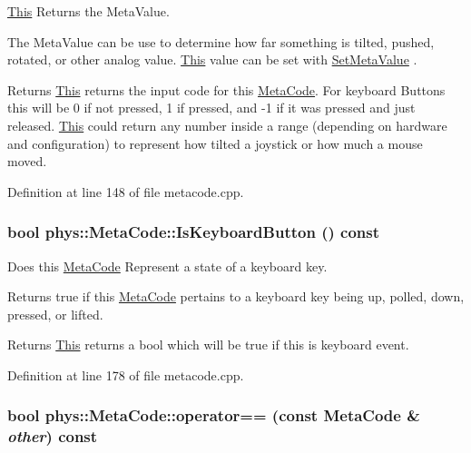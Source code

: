 \hyperlink{structThis}{This} Returns the MetaValue. 

The MetaValue can be use to determine how far something is tilted, pushed, rotated, or other analog value. \hyperlink{structThis}{This} value can be set with \hyperlink{classphys_1_1MetaCode_a31a6390626b08c1bbf08e3f68d2ea764}{SetMetaValue} . \begin{DoxyReturn}{Returns}
\hyperlink{structThis}{This} returns the input code for this \hyperlink{classphys_1_1MetaCode}{MetaCode}. For keyboard Buttons this will be 0 if not pressed, 1 if pressed, and -\/1 if it was pressed and just released. \hyperlink{structThis}{This} could return any number inside a range (depending on hardware and configuration) to represent how tilted a joystick or how much a mouse moved. 
\end{DoxyReturn}


Definition at line 148 of file metacode.cpp.

\hypertarget{classphys_1_1MetaCode_ad86e1599eccea8edecb721eb84c06c72}{
\subsubsection[{IsKeyboardButton}]{\setlength{\rightskip}{0pt plus 5cm}bool phys::MetaCode::IsKeyboardButton () const}}
\label{da/dc9/classphys_1_1MetaCode_ad86e1599eccea8edecb721eb84c06c72}


Does this \hyperlink{classphys_1_1MetaCode}{MetaCode} Represent a state of a keyboard key. 

Returns true if this \hyperlink{classphys_1_1MetaCode}{MetaCode} pertains to a keyboard key being up, polled, down, pressed, or lifted. \begin{DoxyReturn}{Returns}
\hyperlink{structThis}{This} returns a bool which will be true if this is keyboard event. 
\end{DoxyReturn}


Definition at line 178 of file metacode.cpp.

\hypertarget{classphys_1_1MetaCode_a506486e5a6f08d50a5af42fa6d48a7f5}{
\subsubsection[{operator==}]{\setlength{\rightskip}{0pt plus 5cm}bool phys::MetaCode::operator== (const {\bf MetaCode} \& {\em other}) const}}
\label{da/dc9/classphys_1_1MetaCode_a506486e5a6f08d50a5af42fa6d48a7f5}


